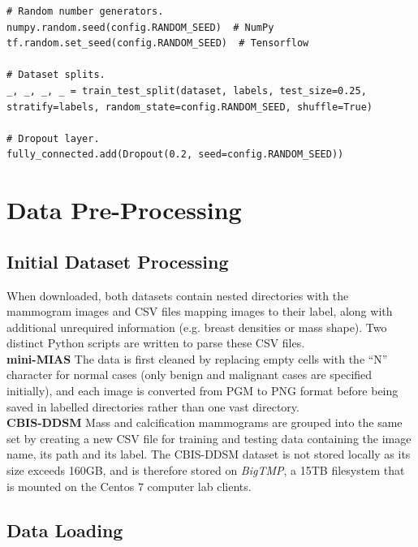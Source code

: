 \begin{lstlisting}[numbers=none]
# Random number generators.
numpy.random.seed(config.RANDOM_SEED)  # NumPy
tf.random.set_seed(config.RANDOM_SEED)  # Tensorflow

# Dataset splits.
_, _, _, _ = train_test_split(dataset, labels, test_size=0.25, stratify=labels, random_state=config.RANDOM_SEED, shuffle=True)

# Dropout layer.
fully_connected.add(Dropout(0.2, seed=config.RANDOM_SEED))
\end{lstlisting}


\section{Data Pre-Processing}

\subsection{Initial Dataset Processing}

When downloaded, both datasets contain nested directories with the mammogram images and CSV files mapping images to their label, along with additional unrequired information (e.g. breast densities or mass shape). Two distinct Python scripts are written to parse these CSV files.\\

\textbf{mini-MIAS} \space The data is first cleaned by replacing empty cells with the ``N'' character for normal cases (only benign and malignant cases are specified initially), and each image is converted from PGM to PNG format before being saved in labelled directories rather than one vast directory.\\

\textbf{CBIS-DDSM} \space Mass and calcification mammograms are grouped into the same set by creating a new CSV file for training and testing data containing the image name, its path and its label. The CBIS-DDSM dataset is not stored locally as its size exceeds 160GB, and is therefore stored on \textit{BigTMP}, a 15TB filesystem that is mounted on the Centos 7 computer lab clients.


\subsection{Data Loading}

